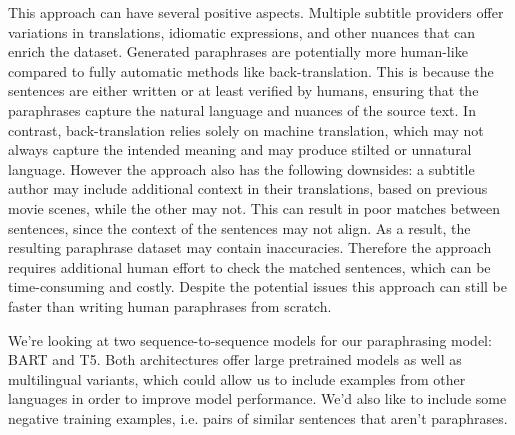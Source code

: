 \documentclass[fleqn,moreauthors,10pt]{ds_report}
\begin{document}
This approach can have several positive aspects. Multiple subtitle providers offer variations in translations, idiomatic expressions, and other nuances that can enrich the dataset. Generated paraphrases are potentially more human-like compared to fully automatic methods like back-translation. This is because the sentences are either written or at least verified by humans, ensuring that the paraphrases capture the natural language and nuances of the source text. In contrast, back-translation relies solely on machine translation, which may not always capture the intended meaning and may produce stilted or unnatural language. However the approach also has the following downsides: a subtitle author may include additional context in their translations, based on previous movie scenes, while the other may not. This can result in poor matches between sentences, since the context of the sentences may not align. As a result, the resulting paraphrase dataset may contain inaccuracies. Therefore the approach requires additional human effort to check the matched sentences, which can be time-consuming and costly. Despite the potential issues this approach can still be faster than writing human paraphrases from scratch.


We're looking at two sequence-to-sequence models for our paraphrasing model: BART and T5. Both architectures offer large pretrained models as well as multilingual variants, which could allow us to include examples from other languages in order to improve model performance. We'd also like to include some negative training examples, i.e. pairs of similar sentences that aren't paraphrases.
 
\end{document}
